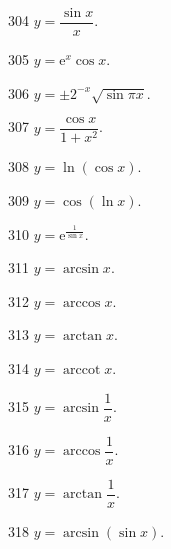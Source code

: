 \begin{prob}[S]{304}
$y = \dfrac{\sin x}{x}$.
\end{prob}

\begin{prob}[S]{305}
$y = \mathrm{e}^x\cos x$.
\end{prob}

\begin{prob}[S]{306}
$y = \pm 2^{-x}\sqrt{\sin\pi x}$.
\end{prob}

\begin{prob}[S]{307}
$y = \dfrac{\cos x}{1 + x^2}$.
\end{prob}

\begin{prob}[S]{308}
$y = \ln(\cos x)$.
\end{prob}

\begin{prob}[S]{309}
$y = \cos(\ln x)$.
\end{prob}

\begin{prob}[S]{310}
$y = \mathrm{e}^{\frac{1}{\sin x}}$.
\end{prob}


\begin{prob}[S]{311}
$y = \arcsin x$.
\end{prob}

\begin{prob}[S]{312}
$y = \arccos x$.
\end{prob}

\begin{prob}[S]{313}
$y = \arctan x$.
\end{prob}

\begin{prob}[S]{314}
$y = \operatorname{arccot} x$.
\end{prob}

\begin{prob}[S]{315}
$y = \arcsin\dfrac{1}{x}$.
\end{prob}

\begin{prob}[S]{316}
$y = \arccos\dfrac{1}{x}$.
\end{prob}

\begin{prob}[S]{317}
$y = \arctan\dfrac{1}{x}$.
\end{prob}

\begin{prob}[S]{318}
$y = \arcsin(\sin x)$.
\end{prob}

